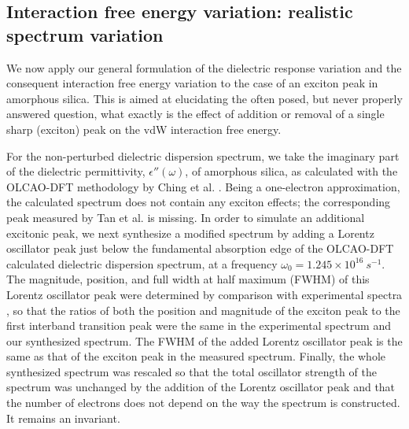 \documentclass[letterpaper,twocolumn,amsmath,amssymb,floatfix,aps,superscriptaddress]{revtex4}
\begin{document}
\subsection{Interaction free energy variation: realistic spectrum variation}

We now apply our general formulation of the dielectric response variation and the consequent interaction free energy variation to the case of an exciton peak in amorphous silica. This is aimed at elucidating the often posed, but never properly answered question,  what exactly is the effect of addition or removal of a single sharp (exciton) peak on the vdW interaction free energy.

For the non-perturbed dielectric dispersion spectrum, we take the imaginary part of the dielectric permittivity, $\epsilon''(\omega)$, of amorphous silica, as calculated with the OLCAO-DFT methodology by Ching et al. \cite{silica}. Being a one-electron approximation, the calculated spectrum does not contain any exciton effects; the corresponding peak measured by Tan et al. \cite{Tan} is missing.  In order to simulate an additional excitonic peak, we next synthesize a modified spectrum by adding a Lorentz oscillator peak just below the fundamental absorption edge of the OLCAO-DFT calculated dielectric dispersion spectrum, at a frequency $ \omega_0 = 1.245 \times 10^{16}~s^{-1}$. The magnitude, position, and full width at half maximum (FWHM) of this Lorentz oscillator peak were determined by comparison with experimental spectra \cite{Tan}, so that the ratios of both the position and magnitude of the exciton peak to the first interband transition peak were the same in the experimental spectrum and our synthesized spectrum. The FWHM of the added Lorentz oscillator peak is the same as that of the exciton peak in the measured spectrum. Finally, the whole synthesized spectrum was rescaled so that the total oscillator strength of the spectrum was unchanged by the addition of the Lorentz oscillator peak and that the number of electrons does not depend on the way the spectrum is constructed. It remains an invariant.
\end{document}
